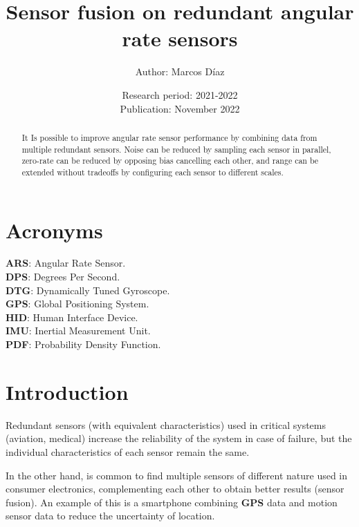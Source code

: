 \documentclass[10pt, twocolumn, a4paper]{article}
\begin{document}
    \title{Sensor fusion on redundant angular rate sensors}
    \author{
        Author: Marcos Díaz
    }
    \date{
        Research period: 2021-2022\\
        Publication: November 2022\\
    }
    \maketitle


\begin{abstract}
    It Is possible to improve angular rate sensor performance by combining data from multiple redundant sensors. Noise can be reduced by sampling each sensor in parallel, zero-rate can be reduced by opposing bias cancelling each other, and range can be extended without tradeoffs by configuring each sensor to different scales.
\end{abstract}

\section*{Acronyms}
    {\textbf{ARS}}: Angular Rate Sensor.\\
    {\textbf{DPS}}: Degrees Per Second.\\
    {\textbf{DTG}}: Dynamically Tuned Gyroscope.\\
    {\textbf{GPS}}: Global Positioning System.\\
    {\textbf{HID}}: Human Interface Device.\\
    {\textbf{IMU}}: Inertial Measurement Unit.\\
    {\textbf{PDF}}: Probability Density Function.


\section{Introduction}
    Redundant sensors (with equivalent characteristics) used in critical systems (aviation, medical) increase the reliability of the system in case of failure, but the individual characteristics of each sensor remain the same. \cite{sensor_failure_detection}

    In the other hand, is common to find multiple sensors of different nature used in consumer electronics, complementing each other to obtain better results (sensor fusion). An example of this is a smartphone combining {\textbf{GPS}} data and motion sensor data to reduce the uncertainty of location. \cite{adaptive_kalman}
\end{document}
